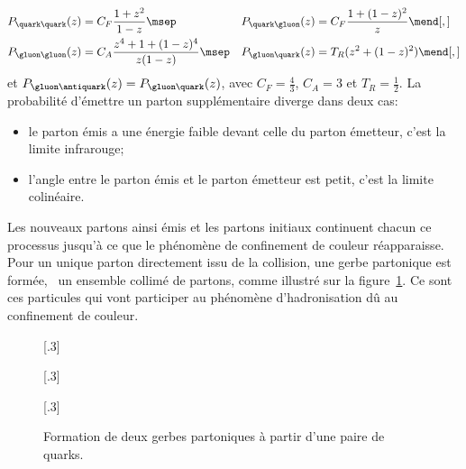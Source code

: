 \begin{align}
P_{\quark\quark}(z) &= C_F \frac{1+z^2}{1-z} \msep&
P_{\quark\gluon}(z) &= C_F \frac{1+(1-z)^2}{z} \mend[,]
\\
P_{\gluon\gluon}(z) &= C_A \frac{z^4 + 1 + (1-z)^4}{z(1-z)} \msep&
P_{\gluon\quark}(z) &= T_R (z^2+(1-z)^2) \mend[,]
\end{align}
et $P_{\gluon\antiquark}(z) = P_{\gluon\quark}(z)$,
avec
$C_F=\frac{4}{3}$,
$C_A = 3$ et
$T_R=\frac{1}{2}$.
La probabilité d'émettre un parton supplémentaire diverge dans deux cas:
\begin{itemize}
\item le parton émis a une énergie faible devant celle du parton émetteur, c'est la limite infrarouge;
\item l'angle entre le parton émis et le parton émetteur est petit, c'est la limite colinéaire.
\end{itemize}
\par Les nouveaux partons ainsi émis et les partons initiaux continuent chacun ce processus jusqu'à ce que le phénomène de confinement de couleur réapparaisse. Pour un unique parton directement issu de la collision, une gerbe partonique est formée, \ie\ un ensemble collimé de partons, comme illustré sur la figure~\ref{fig-parton_shower}.
Ce sont ces particules qui vont participer au phénomène d'hadronisation dû au confinement de couleur.
\begin{figure}[h]
\centering
{}[.3\textwidth]
{\begin{tikzpicture}

\end{tikzpicture}}
\hfill
{}[.3\textwidth]
{\begin{tikzpicture}


\end{tikzpicture}}
\hfill
{}[.3\textwidth]
{\begin{tikzpicture}



\end{tikzpicture}}

\caption[Formation de deux gerbes partoniques.]{Formation de deux gerbes partoniques à partir d'une paire de quarks.}
\label{fig-parton_shower}
\end{figure}

